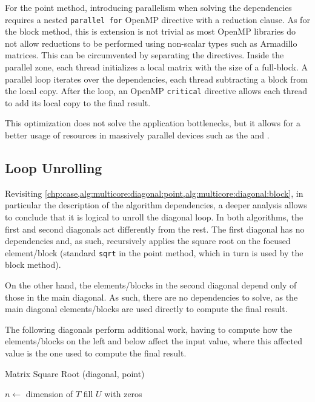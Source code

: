\documentclass[../thesis]{subfiles}
\begin{document}
		For the point method, introducing parallelism when solving the dependencies requires a nested \texttt{parallel for} OpenMP directive with a reduction clause. As for the block method, this is extension is not trivial as most OpenMP libraries do not allow reductions to be performed using non-scalar types such as Armadillo matrices. This can be circumvented by separating the directives. Inside the parallel zone, each thread initializes a local matrix with the size of a full-block. A parallel loop iterates over the dependencies, each thread subtracting a block from the local copy. After the loop, an OpenMP \texttt{critical} directive allows each thread to add its local copy to the final result.

		This optimization does not solve the application bottlenecks, but it allows for a better usage of resources in massively parallel devices such as the \intel\xeonphi and \gpus.

		\subsection{Loop Unrolling}
		Revisiting \cref{chp:case,alg:multicore:diagonal:point,alg:multicore:diagonal:block}, in particular the description of the algorithm dependencies, a deeper analysis allows to conclude that it is logical to unroll the diagonal loop. In both algorithms, the first and second diagonals act differently from the rest. The first diagonal has no dependencies and, as such, recursively applies the square root on the focused element/block (standard \texttt{sqrt} in the point method, which in turn is used by the block method).

		On the other hand, the elements/blocks in the second diagonal depend only of those in the main diagonal. As such, there are no dependencies to solve, as the main diagonal elements/blocks are used directly to compute the final result.

		The following diagonals perform additional work, having to compute how the elements/blocks on the left and below affect the input value, where this affected value is the one used to compute the final result.

		\begin{algorithm}[htp]
			\caption[Matrix Square Root Unrolled (diagonal, point)]{Matrix Square Root (diagonal, point)}
			\label{alg:mic:diagonal:point}
			\DontPrintSemicolon



			$n \leftarrow$ dimension of $T$\;
			fill $U$ with zeros\;

			\;
			\;
		\end{algorithm}
\end{document}
